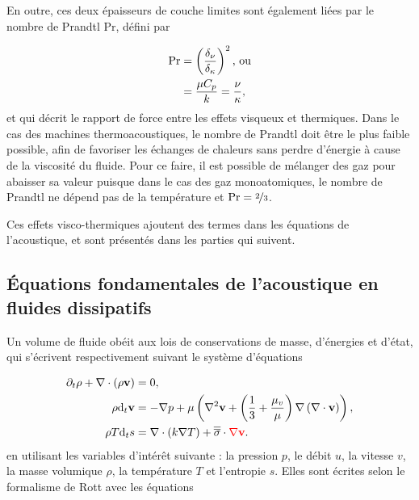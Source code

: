 En outre, ces deux épaisseurs de couche limites sont également liées par le nombre de Prandtl $\mathrm{Pr}$, défini par

\begin{subequations}
	\begin{align}
		\mathrm{Pr} &= \left(\frac{\delta_{\nu}}{\delta_{\kappa}}\right)^2 \text{, ou} \label{eq:Prandtl_delta}\\
				&= \frac{\mu C_{p}}{k} = \frac{\nu}{\kappa}, \label{eq:Prandtl_MuK_NuKappa}
	\end{align}
	\label{eq:Prandtl}%
\end{subequations}
et qui décrit le rapport de force entre les effets visqueux et thermiques. Dans le cas des machines thermoacoustiques, le nombre de Prandtl doit être le plus faible possible, afin de favoriser les échanges de chaleurs sans perdre d'énergie à cause de la viscosité du fluide. Pour ce faire, il est possible de mélanger des gaz pour abaisser sa valeur \cite{belcher_working_1999} puisque dans le cas des gaz monoatomiques, le nombre de Prandtl ne dépend pas de la température et $\mathrm{Pr}=\nicefrac{2}{3}$.

Ces effets visco-thermiques ajoutent des termes dans les équations de l'acoustique, et sont présentés dans les parties qui suivent.

\subsection{\'Equations fondamentales de l'acoustique en fluides dissipatifs}

Un volume de fluide obéit aux lois de conservations de masse, d'énergies et d'état, qui s'écrivent respectivement suivant le système d'équations

\begin{subequations}
	\begin{align}
		\partial_t \rho + \nabla \cdot (\rho \mathbf v) &= 0, \label{eq:ConservMass}\\
		\rho \mathrm{d}_t \mathbf v &= -\nabla p + \mu\left( \nabla^2 \mathbf v +\left(\frac13+\frac{\mu_v}{\mu} \right)\nabla\left(\nabla \cdot \mathbf v\right)\right), \label{eq:NavierStokes_QteMvt_base}\\
		\rho T\mathrm{d}_t s &= \nabla\cdot (k \nabla T) + \overline{\overline{\sigma}}\cdot \textcolor{red}{\nabla \mathbf v}. \label{eq:ConservEnergie}
	\end{align}
\end{subequations}
en utilisant les variables d'intérêt suivante : la pression $p$, le débit $u$, la vitesse $v$, la masse volumique $\rho$, la température $T$ et l'entropie $s$. Elles sont écrites selon le formalisme de Rott avec les équations

